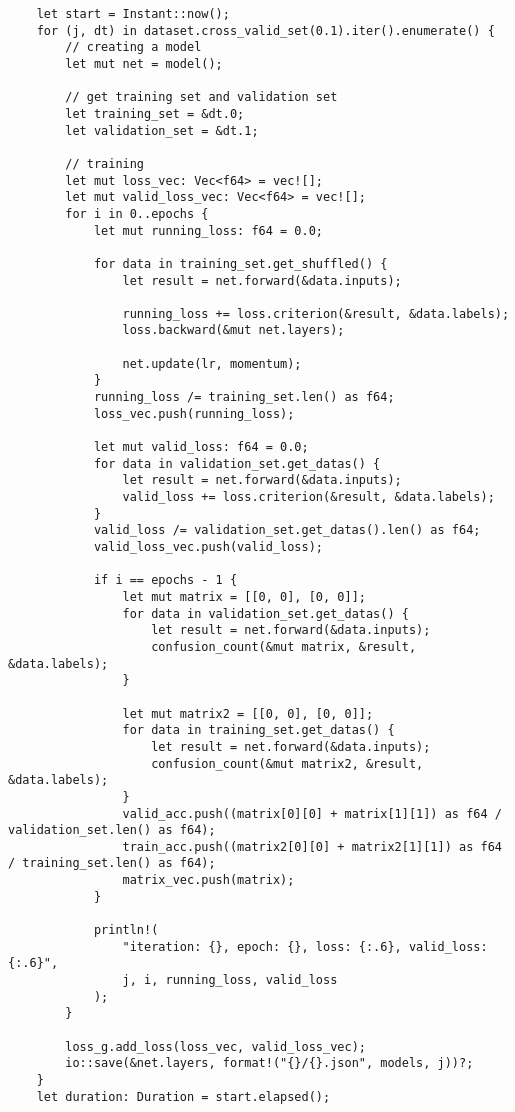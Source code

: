 \begin{verbatim}
    let start = Instant::now();
    for (j, dt) in dataset.cross_valid_set(0.1).iter().enumerate() {
        // creating a model
        let mut net = model();

        // get training set and validation set
        let training_set = &dt.0;
        let validation_set = &dt.1;

        // training
        let mut loss_vec: Vec<f64> = vec![];
        let mut valid_loss_vec: Vec<f64> = vec![];
        for i in 0..epochs {
            let mut running_loss: f64 = 0.0;

            for data in training_set.get_shuffled() {
                let result = net.forward(&data.inputs);

                running_loss += loss.criterion(&result, &data.labels);
                loss.backward(&mut net.layers);

                net.update(lr, momentum);
            }
            running_loss /= training_set.len() as f64;
            loss_vec.push(running_loss);

            let mut valid_loss: f64 = 0.0;
            for data in validation_set.get_datas() {
                let result = net.forward(&data.inputs);
                valid_loss += loss.criterion(&result, &data.labels);
            }
            valid_loss /= validation_set.get_datas().len() as f64;
            valid_loss_vec.push(valid_loss);

            if i == epochs - 1 {
                let mut matrix = [[0, 0], [0, 0]];
                for data in validation_set.get_datas() {
                    let result = net.forward(&data.inputs);
                    confusion_count(&mut matrix, &result, &data.labels);
                }

                let mut matrix2 = [[0, 0], [0, 0]];
                for data in training_set.get_datas() {
                    let result = net.forward(&data.inputs);
                    confusion_count(&mut matrix2, &result, &data.labels);
                }
                valid_acc.push((matrix[0][0] + matrix[1][1]) as f64 / validation_set.len() as f64);
                train_acc.push((matrix2[0][0] + matrix2[1][1]) as f64 / training_set.len() as f64);
                matrix_vec.push(matrix);
            }

            println!(
                "iteration: {}, epoch: {}, loss: {:.6}, valid_loss: {:.6}",
                j, i, running_loss, valid_loss
            );
        }

        loss_g.add_loss(loss_vec, valid_loss_vec);
        io::save(&net.layers, format!("{}/{}.json", models, j))?;
    }
    let duration: Duration = start.elapsed();


\end{verbatim}
